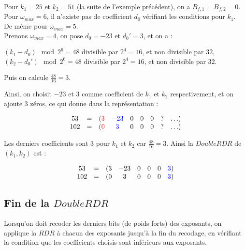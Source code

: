 \documentclass[12pt, a4paper]{memoir}
\begin{document}
 \begin{Exemple}
  Pour $k_1 = 25$ et $k_2 = 51$ (la suite de l'exemple précédent), on a $B_{f,1} = B_{f,2} = 0$. \\
  Pour $\omega_{max} = 6$, il n'existe pas de coefficient $d_0$ vérifiant les conditions pour $k_1$. \\
  De même pour $\omega_{max} = 5$. \\
  Prenons $\omega_{max} = 4$, on pose $d_0 = -23$ et $d_0' = 3$, et on a : \\
  \begin{center}
   $(k_1 - d_0) \mod 2^6 = 48$ divisible par $2^4 = 16$, et non divisible par $32$, \\
   $(k_2 - d_0') \mod 2^6 = 48$ divisible par $2^4 = 16$, et non divisible par $32$.
  \end{center}
  
  Puis on calcule $\frac{48}{16} = 3$.

  Ainsi, on choisit $-23$ et $3$ comme coefficient de $k_1$ et $k_2$ respectivement, et on ajoute $3$ zéros,
  ce qui donne dans la représentation :
  
 $$\begin{array}{ccccccccc}
  53 & = & (\textcolor{red}{3} & \textcolor{blue}{-23} & 0 & 0 & 0 & ? & \ldots) \\
  102 & = & (\textcolor{red}{0} & \textcolor{blue}{3} & 0 & 0 & 0 & ? & \ldots)
 \end{array}$$
 
 Les derniers coefficients sont $3$ pour $k_1$ et $k_2$ car $\frac{48}{16} = 3$. Ainsi la $DoubleRDR$ de $(k_1,k_2)$ est :
 
 $$\begin{array}{cccccccc}
  53 & = & (3 & -23 & 0 & 0 & 0 & \textcolor{blue}{3}) \\
  102 & = & (0 & 3 & 0 & 0 & 0 & \textcolor{blue}{3})
 \end{array}$$
 \end{Exemple}

 \subsection{Fin de la $DoubleRDR$}
 
 Lorsqu'on doit recoder les derniers bits (de poids forts) des exposants, on applique la $RDR$ à chacun des exposants
 jusqu'à la fin du recodage, en vérifiant la condition que les coefficients choisis sont inférieurs aux exposants.
 
\end{document}
